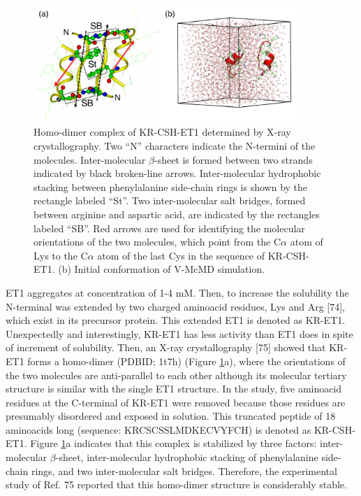 \begin{figure}
  \centering
  \includegraphics[width=10cm]{../enhance_rev/figures/et1_conf.pdf}
  \caption{\label{fig:et1_conf_fig} Homo-dimer complex of KR-CSH-ET1 determined by X-ray crystallography. Two “N” characters indicate the N-termini of the molecules. Inter-molecular $\beta$-sheet is formed between two strands indicated by black broken-line arrows. Inter-molecular hydrophobic stacking between phenylalanine side-chain rings is shown by the rectangle labeled “St”. Two inter-molecular salt bridges, formed between arginine and aspartic acid, are indicated by the rectangles labeled “SB”. Red arrows are used for identifying the molecular orientations of the two molecules, which point from the C$\alpha$ atom of Lys to the C$\alpha$ atom of the last Cys in the sequence of KR-CSH-ET1. (b) Initial conformation of V-McMD simulation.}
\end{figure}
ET1 aggregates at concentration of 1-4 mM. Then, to increase the solubility the N-terminal was extended by two charged aminoacid residues, Lys and Arg [74], which exist in its precursor protein. This extended ET1 is denoted as KR-ET1. Unexpectedly and interestingly, KR-ET1 has less activity than ET1 does in spite of increment of solubility. Then, an X-ray crystallography [75] showed that KR-ET1 forms a homo-dimer (PDBID; 1t7h) (Figure \ref{fig:et1_conf_fig}a), where the orientations of the two molecules are anti-parallel to each other although its molecular tertiary structure is similar with the single ET1 structure. In the study, five aminoacid residues at the C-terminal of KR-ET1 were removed because those residues are presumably disordered and exposed in solution. This truncated peptide of 18 aminoacids long (sequence: KRCSCSSLMDKECVYFCH) is denoted as KR-CSH-ET1. Figure \ref{fig:et1_conf_fig}a indicates that this complex is stabilized by three factors: inter-molecular $\beta$-sheet, inter-molecular hydrophobic stacking of phenylalanine side-chain rings, and two inter-molecular salt bridges. Therefore, the experimental study of Ref. 75 reported that this homo-dimer structure is considerably stable.

